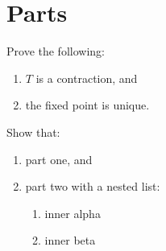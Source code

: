 \section{Parts}

Prove the following:

\begin{enumerate}
    \item $T$ is a contraction, and
    \item the fixed point is unique.
\end{enumerate}

\begin{Exercise}\label{ex:parts}
    Show that:
    \begin{enumerate}
        \item part one, and
        \item part two with a nested list:
        \begin{enumerate}
            \item inner alpha
            \item inner beta
        \end{enumerate}
    \end{enumerate}
\end{Exercise}
